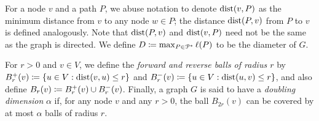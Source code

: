 For a node $v$ and a path $P$, we abuse notation to denote $\mbox{dist}(v,P)$ as the minimum distance from $v$ to any node $w\in P$; the distance $\mbox{dist}(P,v)$ from $P$ to $v$ is defined analogously.
Note that  $\mbox{dist}(P,v)$ and  $\mbox{dist}(v,P)$ need not be the same as the graph is directed.
We define $D\coloneqq\max_{P\in\mathcal{P}^*}\ell(P)$ to be the diameter of $G$.


For $r>0$ and $v\in V$, we define the \emph{forward and reverse balls of radius $r$} by $B^+_r(v)\coloneqq\{u\in V: \mbox{dist}(v,u)\leq r\}$ and $B^-_r(v)\coloneqq\{u\in V: \mbox{dist}(u,v)\leq r\}$, and also define $B_r(v)\coloneqq B^+_r(v)\cup B^-_r(v)$.
Finally, a graph $G$ is said to have a \emph{doubling dimension} $\alpha$ if, for any node $v$ and any $r>0$, the ball $B_{2r}(v)$ can be covered by at most $\alpha$ balls of radius $r$.